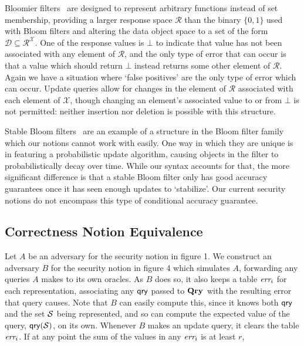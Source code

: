 Bloomier filters~\cite{xxx} are designed to represent arbitrary functions instead of set membership, providing a larger response space $\mathcal{R}$ than the binary $\{0,1\}$ used with Bloom filters and altering the data object space to a set of the form $\mathcal{D} \subseteq \mathcal{R}^\mathcal{X}$. One of the response values is $\bot$ to indicate that value has not been associated with any element of $\mathcal{R}$, and the only type of error that can occur is that a value which should return $\bot$ instead returns some other element of $\mathcal{R}$. Again we have a situation where `false positives' are the only type of error which can occur. Update queries allow for changes in the element of $\mathcal{R}$ associated with each element of $\mathcal{X}$, though changing an element's associated value to or from $\bot$ is not permitted: neither insertion nor deletion is possible with this structure.

Stable Bloom filters~\cite{xxx} are an example of a structure in the Bloom filter family which our notions cannot work with easily. One way in which they are unique is in featuring a probabilistic update algorithm, causing objects in the filter to probabilistically decay over time. While our syntax accounts for that, the more significant difference is that a stable Bloom filter only has good accuracy guarantees once it has seen enough updates to `stabilize'. Our current security notions do not encompass this type of conditional accuracy guarantee.

\subsection{Correctness Notion Equivalence}

Let $A$ be an adversary for the security notion in figure 1. We construct an adversary $B$ for the security notion in figure 4 which simulates $A$, forwarding any queries $A$ makes to its own oracles. As $B$ does so, it also keeps a table $\textit{err}_i$ for each representation, associating any $\mathsf{qry}$ passed to $\mathbf{Qry}\hspace{0.5pt}$ with the resulting error that query causes. Note that $B$ can easily compute this, since it knows both $\mathsf{qry}$ and the set $\mathcal{S}$ being represented, and so can compute the expected value of the query, $\mathsf{qry}(\mathcal{S})$, on its own. Whenever $B$ makes an update query, it clears the table $\textit{err}_i$. If at any point the sum of the values in any $\textit{err}_i$ is at least $r$, 

